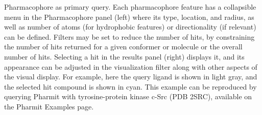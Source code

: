 \label{pharmfig} 
Pharmacophore as primary query. Each pharmacophore feature has a collapsible menu in the Pharmacophore panel (left) where its type, location, and radius, as well as number of atoms (for hydrophobic features) or directionality (if relevant) can be defined. Filters may be set to reduce the number of hits, by constraining the number of hits returned for a given conformer or molecule or the overall number of hits. Selecting a hit in the results panel (right) displays it, and its appearance can be adjusted in the visualization filter along with other aspects of the visual display.  For example, here the query ligand is shown in light gray, and the selected hit compound is shown in cyan. This example can be reproduced by querying Pharmit with tyrosine-protein kinase c-Src (PDB 2SRC), available on the Pharmit Examples page.
